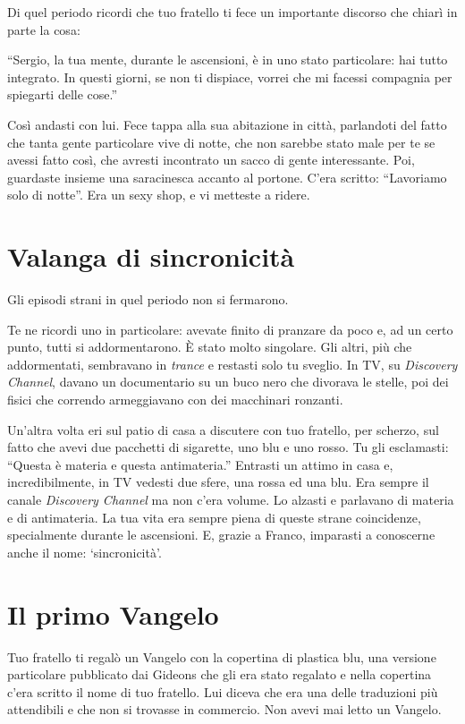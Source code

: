 Di quel periodo ricordi che tuo fratello ti fece un importante discorso che chiarì in parte la cosa:

“Sergio, la tua mente, durante le ascensioni, è in uno stato particolare: hai tutto integrato. In questi giorni, se non ti dispiace, vorrei che mi facessi compagnia per spiegarti delle cose.”

Così andasti con lui. Fece tappa alla sua abitazione in città, parlandoti del fatto che tanta gente particolare vive di notte, che non sarebbe stato male per te se avessi fatto così, che avresti incontrato un sacco di gente interessante. Poi, guardaste insieme una saracinesca accanto al portone. C'era scritto: “Lavoriamo solo di notte”. Era un sexy shop, e vi metteste a ridere.

\section{Valanga di sincronicità}
\label{valanga_di_sincronicità}

Gli episodi strani in quel periodo non si fermarono.

Te ne ricordi uno in particolare: avevate finito di pranzare da poco e, ad un certo punto, tutti si addormentarono. È stato molto singolare. Gli altri, più che addormentati, sembravano in \textit{trance} e restasti solo tu sveglio. In TV, su \textit{Discovery Channel}, davano un documentario su un buco nero che divorava le stelle, poi dei fisici che correndo armeggiavano con dei macchinari ronzanti.

Un'altra volta eri sul patio di casa a discutere con tuo fratello, per scherzo, sul fatto che avevi due pacchetti di sigarette, uno blu e uno rosso. Tu gli esclamasti: “Questa è materia e questa antimateria.” Entrasti un attimo in casa e, incredibilmente, in TV vedesti due sfere, una rossa ed una blu. Era sempre il canale \textit{Discovery Channel} ma non c'era volume. Lo alzasti e parlavano di materia e di antimateria. La tua vita era sempre piena di queste strane coincidenze, specialmente durante le ascensioni. E, grazie a Franco, imparasti a conoscerne anche il nome: ‘sincronicità’.

\section{Il primo Vangelo}
\label{vangelo}

Tuo fratello ti regalò un Vangelo con la copertina di plastica blu, una versione particolare pubblicato dai Gideons che gli era stato regalato e nella copertina c'era scritto il nome di tuo fratello. Lui diceva che era una delle traduzioni più attendibili e che non si trovasse in commercio. Non avevi mai letto un Vangelo.

